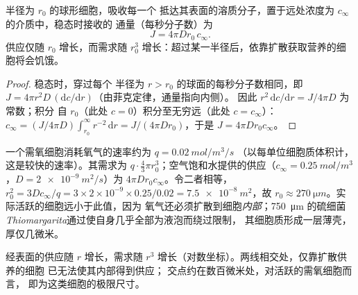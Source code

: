 \begin{theorem}[球形细胞的扩散供应]\label{thm:b2:unicellular-diversity:supply}
半径为 $r_0$ 的球形细胞，吸收每一个
抵达其表面的溶质分子，置于远处浓度为
$c_\infty$ 的介质中，稳态时接收的
通量（每秒分子数）为
\[
J = 4\pi D r_0\, c_\infty .
\]
供应仅随 $r_0$ 增长，而需求随
$r_0^3$ 增长：超过某一半径后，依靠扩散获取营养的细胞将会饥饿。
\end{theorem}
\begin{proof}
稳态时，穿过每个
半径为 $r > r_0$ 的球面的每秒分子数相同，即 $J = 4\pi r^2 D\,
(\mathrm{d}c/\mathrm{d}r)$（由菲克定律，通量指向内侧）。
因此 $r^2\,\mathrm{d}c/\mathrm{d}r = J/4\pi D$ 为常数；积分
自 $r_0$（此处 $c = 0$）积分至无穷远（此处 $c = c_\infty$）：
$c_\infty = (J/4\pi D)\int_{r_0}^{\infty} r^{-2}\,\mathrm{d}r =
J/(4\pi D r_0)$，于是 $J = 4\pi D r_0 c_\infty$。
\end{proof}

\begin{example}[依靠扩散供养的细胞能有多大？]\label{ex:b2:unicellular-diversity:howbig}
一个需氧细胞消耗氧气的速率约为 $q = \qty{0.02}{mol/m^3/s}$
（以每单位细胞质体积计，这是较快的速率）。其需求为 $q \cdot \tfrac{4}{3}\pi
r_0^3$；空气饱和水提供的供应（$c_\infty =
\qty{0.25}{mol/m^3}$，$D = \qty{2e-9}{m^2/s}$）为 $4\pi D r_0
c_\infty$。令二者相等，$r_0^2 = 3Dc_\infty/q = 3\times 2\times 10^{-9}
\times 0.25/0.02 = \qty{7.5e-8}{m^2}$，故 $r_0 \approx
\qty{270}{\micro m}$。实际活跃的细胞远小于此值，因为
氧气还必须扩散到细胞\emph{内部}；\qty{750}{\micro m}
的硫细菌\emph{Thiomargarita}通过使自身几乎全部为液泡而绕过限制，
其细胞质形成一层薄壳，
厚仅几微米。
\end{example}

\begin{omfigure}

{\small 经表面的供应随 $r$ 增长，需求随
$r^3$ 增长（对数坐标）。两线相交处，仅靠扩散供养的细胞
已无法使其内部得到供应；
交点约在数百微米处，对活跃的需氧细胞而言，
即为这类细胞的极限尺寸。}
\end{omfigure}

